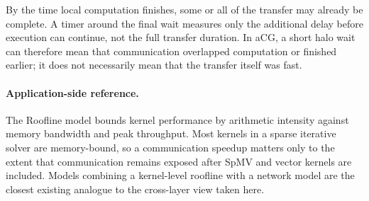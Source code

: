 By the time local computation finishes, some or all of the transfer may already be complete. A timer around the final wait measures only the additional delay before execution can continue, not the full transfer duration. In aCG, a short halo wait can therefore mean that communication overlapped computation or finished earlier; it does not necessarily mean that the transfer itself was fast.

\paragraph{Application-side reference.}
The Roofline model \cite{williams_roofline_2009-1} bounds kernel performance by arithmetic intensity against memory bandwidth and peak throughput. Most kernels in a sparse iterative solver are memory-bound, so a communication speedup matters only to the extent that communication remains exposed after SpMV and vector kernels are included. Models combining a kernel-level roofline with a network model \cite{choi_end--end_2020} are the closest existing analogue to the cross-layer view taken here.
